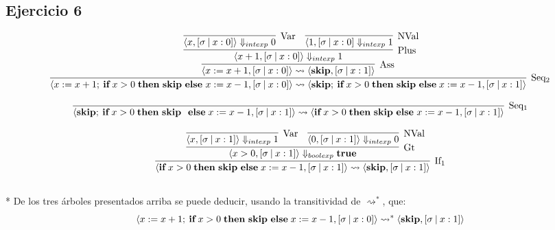 \documentclass[12pt,a4paper]{article}
\begin{document}
\begin{landscape}
\section*{Ejercicio 6}
$$ \infer[\mathrm{Seq_{2}}]
         {\langle x := x+1;\:\textbf{if}\;x>0\;\textbf{then\;skip\;else\;}
          x := x-1, [\sigma\:|\:x:0] \rangle \\* \rightsquigarrow \langle
          \textbf{skip};\:\textbf{if}\;x>0\;\textbf{then\;skip\;else}\;
          x := x-1, [\sigma\:|\:x:1] \rangle}
         {\infer[\mathrm{Ass}]
                {\langle x := x+1, [\sigma\:|\:x:0] \rangle \rightsquigarrow
                 \langle \textbf{skip}, [\sigma\:|\:x:1] \rangle}
                {\infer[\mathrm{Plus}]
                       {\langle x+1, [\sigma\:|\:x:0] \rangle
                        \Downarrow_{intexp} 1}
                       {\infer[\mathrm{Var}]
                              {\langle x,[\sigma\:|\:x:0] \rangle
                               \Downarrow_{intexp} 0}{}
                        & \infer[\mathrm{NVal}]
                                {\langle 1,[\sigma\:|\:x:0]
                                 \Downarrow_{intexp} 1}{}}}}
$$

$$ \infer[\mathrm{Seq_{1}}]
         {\langle \textbf{skip};\:\textbf{if}\;x>0\;\textbf{then\;skip\;
          else}\;x := x-1, [\sigma\:|\:x:1] \rangle \rightsquigarrow
          \langle \textbf{if}\;x>0\;\textbf{then\;skip\;else\;}
          x := x-1, [\sigma\:|\:x:1] \rangle}
         {}
$$


$$ \infer[\mathrm{If_{1}}]
         {\langle \textbf{if}\;x > 0\;\textbf{then\;skip\;else}\;x := x-1,
          [\sigma\:|\:x:1] \rangle \rightsquigarrow \langle \textbf{skip},
          [\sigma\:|\:x:1] \rangle}
         {\infer[\mathrm{Gt}]
                {\langle x > 0, [\sigma\:|\:x:1] \rangle \Downarrow_{boolexp}
                 \textbf{true}}
                {\infer[\mathrm{Var}]
                       {\langle x,[\sigma\:|\:x:1] \rangle
                        \Downarrow_{intexp} 1}{}
                 & \infer[\mathrm{NVal}]
                         {\langle 0,[\sigma\:|\:x:1] \rangle
                          \Downarrow_{intexp} 0}{}
                }
         }
$$
\\*
De los tres \'arboles presentados arriba se puede deducir, usando la
transitividad de $\rightsquigarrow^{*}$, que:
$$ \langle x := x+1;\:\textbf{if}\;x>0\;\textbf{then\;skip\;else}\;
  x := x - 1, [\sigma\:|\: x:0] \rangle \rightsquigarrow^{*} \langle
  \textbf{skip}, [\sigma\:|\: x:1] \rangle
$$
\end{landscape}
\end{document}
